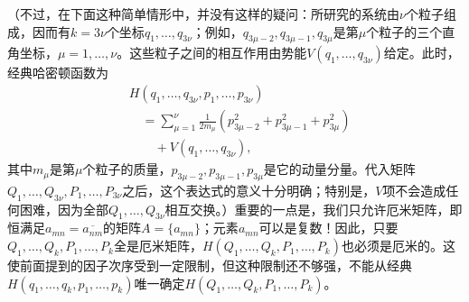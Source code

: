 \documentclass[fontsize=13pt,twoside,openany,headings=normal,parskip=false,bookmarkpackage=false,DIV=calc]{scrbook}
\begin{document}
\hypertarget{origpage-7}{}\label{origpage-7}（不过，在下面这种简单情形中，并没有这样的疑问：所研究的系统由$\nu$个粒子组成，因而有$k=3\nu$个坐标$q_1,\allowbreak \ldots,\allowbreak q_{3\nu}$；例如，$q_{3\mu-2},\allowbreak q_{3\mu-1},\allowbreak q_{3\mu}$是第$\mu$个粒子的三个直角坐标，$\mu=1,\allowbreak \ldots,\allowbreak \nu$。这些粒子之间的相互作用由势能$V(q_1,\allowbreak \ldots,\allowbreak q_{3\nu})$给定。此时，经典哈密顿函数为
\begin{align*}
 &H(q_1,\ldots,q_{3\nu},p_1,\ldots,p_{3\nu})\\
 &\quad=\sum_{\mu=1}^{\nu}\frac{1}{2m_\mu}
 (p_{3\mu-2}^2+p_{3\mu-1}^2+p_{3\mu}^2)\\
 &\qquad+V(q_1,\ldots,q_{3\nu}),
\end{align*}
其中$m_\mu$是第$\mu$个粒子的质量，$p_{3\mu-2},\allowbreak p_{3\mu-1},\allowbreak p_{3\mu}$是它的动量分量。代入矩阵$Q_1,\allowbreak \ldots,\allowbreak Q_{3\nu},\allowbreak P_1,\allowbreak \ldots,\allowbreak P_{3\nu}$之后，这个表达式的意义十分明确；特别是，$V$项不会造成任何困难，因为全部$Q_1,\allowbreak \ldots,\allowbreak Q_{3\nu}$相互交换。）重要的一点是，我们只允许厄米矩阵，即恒满足$a_{mn}=\overline{a_{nm}}$的矩阵$A=\{a_{mn}\}$；元素$a_{mn}$可以是复数！因此，只要$Q_1,\allowbreak \ldots,\allowbreak Q_k,\allowbreak P_1,\allowbreak \ldots,\allowbreak P_k$全是厄米矩阵，$H(Q_1,\allowbreak \ldots,\allowbreak Q_k,\allowbreak P_1,\allowbreak \ldots,\allowbreak P_k)$也必须是厄米的。这使前面提到的因子次序受到一定限制，但这种限制还不够强，不能从经典$H(q_1,\allowbreak \ldots,\allowbreak q_k,\allowbreak p_1,\allowbreak \ldots,\allowbreak p_k)$唯一确定$H(Q_1,\allowbreak \ldots,\allowbreak Q_k,\allowbreak P_1,\allowbreak \ldots,\allowbreak P_k)$。
\end{document}

